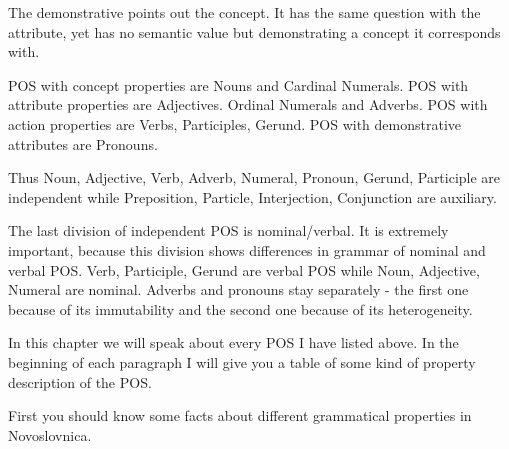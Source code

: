 The demonstrative points out the concept. It has the same question with the attribute, yet has no semantic value but demonstrating a concept it corresponds with. 

POS with concept properties are Nouns and Cardinal Numerals. POS with attribute properties are Adjectives. Ordinal Numerals and Adverbs. POS with action properties are Verbs, Participles, Gerund. POS with demonstrative attributes are Pronouns.

Thus Noun, Adjective, Verb, Adverb, Numeral, Pronoun, Gerund, Participle are independent while Preposition, Particle, Interjection, Conjunction are auxiliary.

The last division of independent POS is nominal/verbal. It is extremely important, because this division shows differences in grammar of nominal and verbal POS. Verb, Participle, Gerund are verbal POS while Noun, Adjective, Numeral are nominal. Adverbs and pronouns stay separately - the first one because of its immutability and the second one because of its heterogeneity. 

In this chapter we will speak about every POS I have listed above. In the beginning of each paragraph I will give you a table of some kind of property description of the POS.

First you should know some facts about different grammatical properties in Novoslovnica.

























